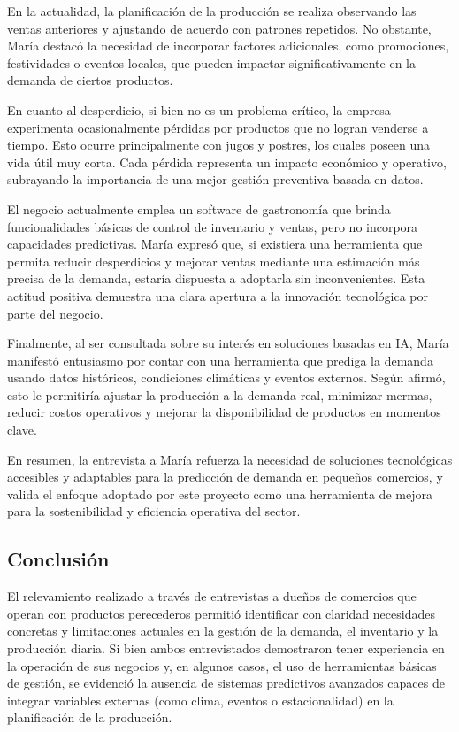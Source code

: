 \indent En la actualidad, la planificación de la producción se realiza observando las ventas anteriores y ajustando de acuerdo con patrones repetidos. No obstante, María destacó la necesidad de incorporar factores adicionales, como promociones, festividades o eventos locales, que pueden impactar significativamente en la demanda de ciertos productos.

\indent En cuanto al desperdicio, si bien no es un problema crítico, la empresa experimenta ocasionalmente pérdidas por productos que no logran venderse a tiempo. Esto ocurre principalmente con jugos y postres, los cuales poseen una vida útil muy corta. Cada pérdida representa un impacto económico y operativo, subrayando la importancia de una mejor gestión preventiva basada en datos.

\indent El negocio actualmente emplea un software de gastronomía que brinda funcionalidades básicas de control de inventario y ventas, pero no incorpora capacidades predictivas. María expresó que, si existiera una herramienta que permita reducir desperdicios y mejorar ventas mediante una estimación más precisa de la demanda, estaría dispuesta a adoptarla sin inconvenientes. Esta actitud positiva demuestra una clara apertura a la innovación tecnológica por parte del negocio.

\indent Finalmente, al ser consultada sobre su interés en soluciones basadas en IA, María manifestó entusiasmo por contar con una herramienta que prediga la demanda usando datos históricos, condiciones climáticas y eventos externos. Según afirmó, esto le permitiría ajustar la producción a la demanda real, minimizar mermas, reducir costos operativos y mejorar la disponibilidad de productos en momentos clave.

\indent En resumen, la entrevista a María refuerza la necesidad de soluciones tecnológicas accesibles y adaptables para la predicción de demanda en pequeños comercios, y valida el enfoque adoptado por este proyecto como una herramienta de mejora para la sostenibilidad y eficiencia operativa del sector.


\subsection{Conclusión}

\indent El relevamiento realizado a través de entrevistas a dueños de comercios que operan con productos perecederos permitió identificar con claridad necesidades concretas y limitaciones actuales en la gestión de la demanda, el inventario y la producción diaria. Si bien ambos entrevistados demostraron tener experiencia en la operación de sus negocios y, en algunos casos, el uso de herramientas básicas de gestión, se evidenció la ausencia de sistemas predictivos avanzados capaces de integrar variables externas (como clima, eventos o estacionalidad) en la planificación de la producción.

